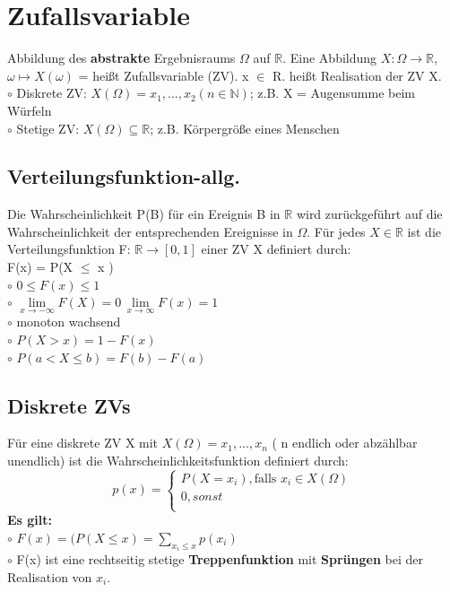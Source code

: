 \section{Zufallsvariable}
Abbildung des \textbf{abstrakte} Ergebnisraums $\Omega$ auf $\mathbb{R}$.
Eine Abbildung $X: \Omega \rightarrow \mathbb{R}$, $\omega \mapsto X(\omega)$ = heißt Zufallsvariable (ZV). x $\in$ R. heißt Realisation der ZV X.\\
    $\circ$ Diskrete ZV: $X(\Omega) = {x_{1}, ..., x_{2}} (n \in \mathbb{N})$; z.B. X = \dq Augensumme beim Würfeln \dq \\
    $\circ$ Stetige ZV: $X(\Omega) \subseteq \mathbb{R}$; \dq z.B. Körpergröße eines Menschen\dq
\subsection{Verteilungsfunktion-allg.}
Die Wahrscheinlichkeit P(B) für ein Ereignis B in $ \mathbb{R} $ wird zurückgeführt auf die Wahrscheinlichkeit der entsprechenden Ereignisse in 
$ \Omega $. Für jedes $ X \in \mathbb{R} $  ist die Verteilungsfunktion F: $ \mathbb{R} \rightarrow [0,1] $ einer ZV X definiert durch:\\
	F(x) = P(X $ \leq $ x )\\
  $\circ$ $ 0 \leq F(x) \leq 1 $\\
  $\circ$ $\lim\limits_{x\to-\infty} F(X)= 0 \, \lim\limits_{x\to\infty} F(x) = 1$\\
  $\circ$ monoton wachsend\\
  $\circ$ $P(X > x) = 1 - F(x)$\\
  $\circ$ $P(a < X \leq b) = F(b) - F(a)$
\subsection{Diskrete ZVs}
Für eine diskrete ZV X mit $X(\Omega) = {x_{1}, ..., x_{n}}$ ( n endlich oder abzählbar unendlich) ist die Wahrscheinlichkeitsfunktion definiert durch:
\begin{equation}
p(x) =
\begin{cases}
	P(X = x_{i}), \text{falls } x_{i} \in X(\Omega )\\
	0, sonst\\
\end{cases}
\end{equation}
\textbf{Es gilt:}\\
	$\circ$ $F(x) = (P(X \leq x) = \sum_{x_{i}\leq x} p(x_{i})$\\
	$\circ$ F(x) ist eine rechtseitig stetige \textbf{Treppenfunktion} mit \textbf{Sprüngen} bei der Realisation von $x_{i}$.
